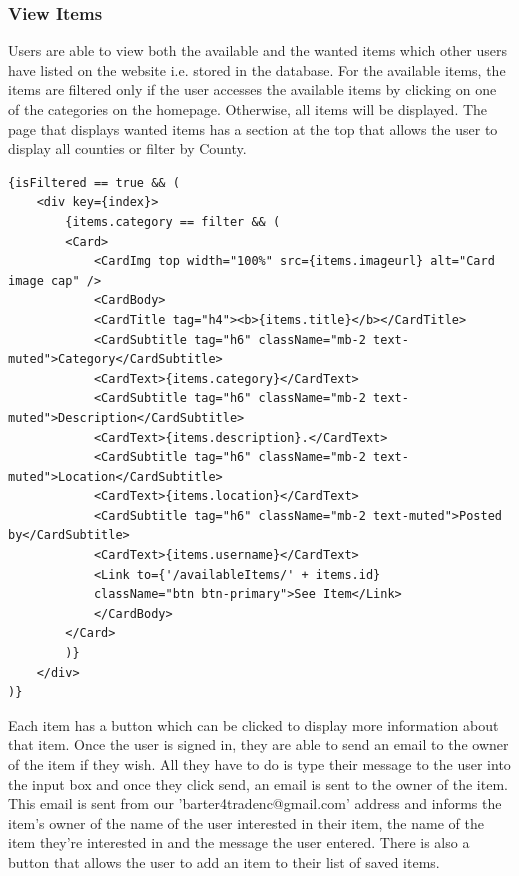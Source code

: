 \subsubsection{View Items}
Users are able to view both the available and the wanted items which other users have listed on the website i.e. stored in the database. For the available items, the items are filtered only if the user accesses the available items by clicking on one of the categories on the homepage. Otherwise, all items will be displayed. The page that displays wanted items has a section at the top that allows the user to display all counties or filter by County.
\begin{verbatim}
{isFiltered == true && (
    <div key={index}>
        {items.category == filter && (
        <Card>
            <CardImg top width="100%" src={items.imageurl} alt="Card image cap" />
            <CardBody>
            <CardTitle tag="h4"><b>{items.title}</b></CardTitle>
            <CardSubtitle tag="h6" className="mb-2 text-muted">Category</CardSubtitle>
            <CardText>{items.category}</CardText>
            <CardSubtitle tag="h6" className="mb-2 text-muted">Description</CardSubtitle>
            <CardText>{items.description}.</CardText>
            <CardSubtitle tag="h6" className="mb-2 text-muted">Location</CardSubtitle>
            <CardText>{items.location}</CardText>
            <CardSubtitle tag="h6" className="mb-2 text-muted">Posted by</CardSubtitle>
            <CardText>{items.username}</CardText>
            <Link to={'/availableItems/' + items.id}
            className="btn btn-primary">See Item</Link>
            </CardBody>
        </Card>
        )}
    </div>
)}
\end{verbatim}

Each item has a button which can be clicked to display more information about that item. Once the user is signed in, they are able to send an email to the owner of the item if they wish. All they have to do is type their message to the user into the input box and once they click send, an email is sent to the owner of the item. This email is sent from our 'barter4tradenc@gmail.com' address and informs the item's owner of the name of the user interested in their item, the name of the item they're interested in and the message the user entered. There is also a button that allows the user to add an item to their list of saved items.
\newpage

